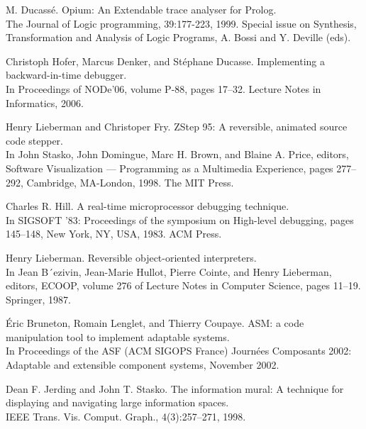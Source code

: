\documentclass[12pt,legalpaper]{report}
\begin{document}
\begin{thebibliography}{30}

 M. Ducassé. Opium: An Extendable trace analyser for Prolog.\\
The Journal of Logic programming, 39:177-223, 1999. Special issue on Synthesis, Transformation and Analysis of Logic Programs, A. Bossi and Y. Deville (eds).


Christoph Hofer, Marcus Denker, and Stéphane Ducasse. Implementing a backward-in-time debugger. \\
In Proceedings of NODe’06, volume P-88, pages 17–32. Lecture Notes in Informatics, 2006.

Henry Lieberman and Christoper Fry. ZStep 95: A reversible, animated source code stepper. \\
In John Stasko, John Domingue, Marc H. Brown, and Blaine A. Price, editors, Software Visualization — Programming as a Multimedia Experience, pages 277–292, Cambridge, MA-London, 1998. The MIT Press.

Charles R. Hill. A real-time microprocessor debugging technique. \\
In SIGSOFT ’83: Proceedings of the symposium on High-level debugging, pages 145–148, New York, NY, USA, 1983. ACM Press.

Henry Lieberman. Reversible object-oriented interpreters. \\
In Jean B´ezivin, Jean-Marie Hullot, Pierre Cointe, and Henry Lieberman, editors, ECOOP, volume 276 of Lecture Notes in Computer Science, pages 11–19. Springer, 1987.

 Éric Bruneton, Romain Lenglet, and Thierry Coupaye. ASM: a code manipulation tool to implement adaptable systems. \\
In Proceedings of the ASF (ACM SIGOPS France) Journées Composants 2002: Adaptable and extensible component systems, November 2002.

 Dean F. Jerding and John T. Stasko. The information mural: A technique for displaying and navigating large information spaces.\\
IEEE Trans. Vis. Comput. Graph., 4(3):257–271, 1998.


\end{thebibliography}
\end{document}
